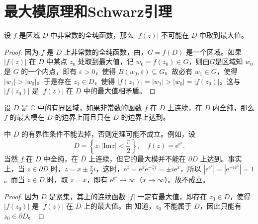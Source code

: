 \documentclass[../../main.tex]{subfiles}%
\begin{document}
\section{最大模原理和Schwarz引理}

\begin{theorem}[最大模原理]\label{theorem:最大模原理-定理4.5.1}
设 \( f \) 是区域 \( D \) 中非常数的全纯函数，那么 \( |f(z)| \) 不可能在 \( D \) 中取到最大值。
\end{theorem}
\begin{proof}

因为 \( f \) 是 \( D \) 上非常数的全纯函数，由，\( G = f(D) \) 是一个区域。如果 \( |f(z)| \) 在 \( D \) 中某点 \( z_0 \) 处取到最大值，记 \( w_0 = f(z_0)\in G \)，则由$G$是区域知 \( w_0 \) 是 \( G \) 的一个内点，即有 \( \varepsilon > 0 \)，使得 \( B(w_0, \varepsilon) \subseteq G \)。故必有 \( w_1 \in G \)，使得 \( |w_1| > |w_0| \)。于是存在 \( z_1 \in D \)，使得 \( |f(z_1)| = |w_1| > |w_0| = |f(z_0)| \)。这与 \( |f(z_0)| \) 是 \( |f(z)| \) 在 \( D \) 中的最大值相矛盾。 

\end{proof}

\begin{theorem}\label{theorem:定理4.5.2}
设 \( D \) 是 \( \mathbb{C} \) 中的有界区域，如果非常数的函数 \( f \) 在 \( \overline{D} \) 上连续，在 \( D \) 内全纯，那么 \( f \) 的最大模在 \( D \) 的边界上而且只在 \( D \) 的边界上达到。
\end{theorem}
\begin{remark}
中 \( D \) 的有界性条件不能去掉，否则定理可能不成立。例如，设
\[
D = \left\{ z : |\text{Im} z| < \frac{\pi}{2} \right\},
\quad
f(z) = \mathrm{e}^{\mathrm{e}^z}.
\]
当然 \( f \) 在 \( D \) 中全纯，在 \( \overline{D} \) 上连续，但它的最大模并不能在 \( \partial D \) 上达到。事实上，当 \( z \in \partial D \) 时，\( z = x \pm \frac{\pi}{2}i \)，这时，\( \mathrm{e}^z = \mathrm{e}^x \mathrm{e}^{\pm \frac{\pi}{2}i} = \pm i\mathrm{e}^x \)，所以 \( |\mathrm{e}^{\mathrm{e}^z}| = |\mathrm{e}^{\pm i\mathrm{e}^x}| = 1 \)。而当 \( z \in D \) 时，取 \( z = x \)，即有 \( \mathrm{e}^{\mathrm{e}^x} \to \infty \)（\( x \to \infty \)）。故不成立。
\end{remark}
\begin{proof}

因为 \( \overline{D} \) 是紧集，其上的连续函数 \( |f| \) 一定有最大值，即存在 \( z_0 \in \overline{D} \)，使得 \( |f(z_0)| \) 是 \( |f(z)| \) 在 \( \overline{D} \) 上的最大值。由 知道，\( z_0 \) 不能属于 \( D \)，因此只能有 \( z_0 \in \partial D \)。 

\end{proof}
\end{document}
